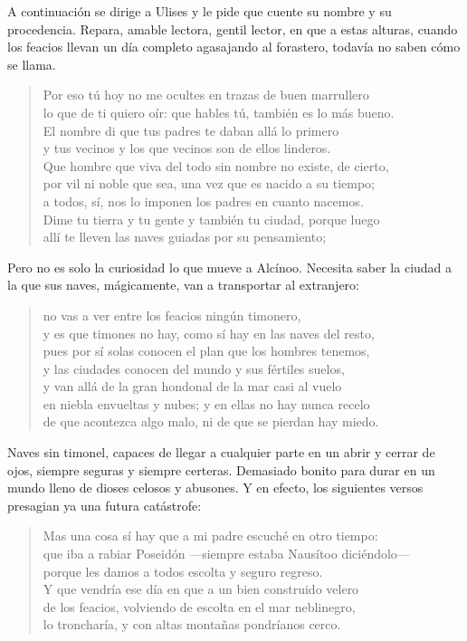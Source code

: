 \documentclass[11pt,a4paper]{article}
\begin{document}
A continuación se dirige a Ulises y le pide que cuente su nombre y su procedencia. Repara, amable lectora, gentil lector, en que a estas alturas, cuando los feacios llevan un día completo agasajando al forastero, todavía no saben cómo se llama.

\begin{verse}
Por eso tú hoy no me ocultes en trazas de buen marrullero\\
lo que de ti quiero oír: que hables tú, también es lo más bueno.\\
El nombre di que tus padres te daban allá lo primero\\
y tus vecinos y los que vecinos son de ellos linderos.\\
Que hombre que viva del todo sin nombre no existe, de cierto,\\
por vil ni noble que sea, una vez que es nacido a su tiempo;\\
a todos, sí, nos lo imponen los padres en cuanto nacemos.\\
Dime tu tierra y tu gente y también tu ciudad, porque luego\\
allí te lleven las naves guiadas por su pensamiento;
\end{verse}

Pero no es solo la curiosidad lo que mueve a Alcínoo. Necesita saber la ciudad a la que sus naves, mágicamente, van a transportar al extranjero:

\begin{verse}
no vas a ver entre los feacios ningún timonero,\\
y es que timones no hay, como sí hay en las naves del resto,\\
pues por sí solas conocen el plan que los hombres tenemos,\\
y las ciudades conocen del mundo y sus fértiles suelos,\\
y van allá de la gran hondonal de la mar casi al vuelo\\
en niebla envueltas y nubes; y en ellas no hay nunca recelo\\
de que acontezca algo malo, ni de que se pierdan hay miedo.
\end{verse}

Naves sin timonel, capaces de llegar a cualquier parte en un abrir y cerrar de ojos, siempre seguras y siempre certeras. Demasiado bonito para durar en un mundo lleno de dioses celosos y abusones. Y en efecto, los siguientes versos presagian ya una futura catástrofe:

\begin{verse}
Mas una cosa sí hay que a mi padre escuché en otro tiempo:\\
que iba a rabiar Poseidón ---siempre estaba Nausítoo diciéndolo---\\
porque les damos a todos escolta y seguro regreso.\\
Y que vendría ese día en que a un bien construido velero\\
de los feacios, volviendo de escolta en el mar neblinegro,\\
lo troncharía, y con altas montañas pondríanos cerco.
\end{verse}
\end{document}
